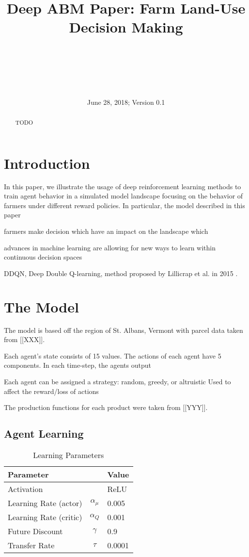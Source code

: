 \documentclass[prepare]{acmconf} %
\title{Deep ABM Paper: Farm Land-Use Decision Making}
\author{
	\Author{Kevin Andrew}\\
	\Address{University of Vermont}\\
	\Email{kandrew6@uvm.edu}
	\and
	\Author{Oth}\\
	\Address{OthAddr}\\
	\Email{OthEmail}
}
\date{June 28, 2018; Version 0.1}
\begin{document}
\maketitle

\begin{abstract}
TODO
\end{abstract}

\section{Introduction}

In this paper, we illustrate the usage of deep reinforcement learning
methods to train agent behavior in a simulated model landscape
focusing on the behavior of farmers under different reward policies.
In particular, the model described in this paper 

farmers make decision which have an impact on the landscape
which

advances in machine learning are allowing for new ways to
learn within continuous decision spaces

DDQN, Deep Double Q-learning, method proposed by Lillicrap et al. in 2015
\cite{lillicrap15}.

\section{The Model}

The model is based off the region of St. Albans, Vermont with
parcel data taken from [[XXX]].

Each agent's state consists of 15 values.
The actions of each agent have 5 components.
In each time-step, the agents output

Each agent can be assigned a strategy: random, greedy, or altruistic
Used to affect the reward/loss of actions

The production functions for each product were taken from [[YYY]].

\subsection{Agent Learning}

\begin{table}
\caption{Learning Parameters}
\label{tab:lparams}
\centering
\begin{tabular}{l c l}
Parameter & & Value \\\hline
Activation & & ReLU \\
Learning Rate (actor) & $\alpha_\mu$ & 0.005 \\
Learning Rate (critic) & $\alpha_Q$ & 0.001 \\
Future Discount & $\gamma$ & 0.9 \\
Transfer Rate & $\tau$ & 0.0001 \\
\end{tabular}
\end{table}
\end{document}
